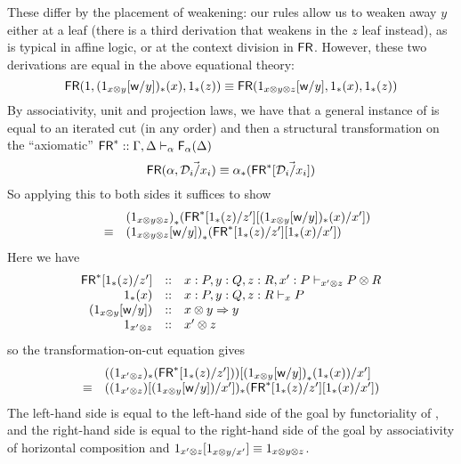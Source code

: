 These differ by the placement of weakening: our rules allow us to weaken
away $y$ either at a leaf (there is a third derivation that weakens in
the $z$ leaf instead), as is typical in affine logic, or at the context
division in $\mathsf{FR}$.  However, these two derivations are equal in the
above equational theory:
\[
\mathsf{FR}(1,(1_{x \otimes y}[\mathsf{w}/y])_*(x),1_*(z))
\equiv
\mathsf{FR}(1_{x \otimes y \otimes z}[\mathsf{w}/y],1_*(x),1_*(z))
\]
By associativity, unit and projection laws, we have that a general
instance of \FR\/ is equal to an iterated cut (in any order) and then a
structural transformation on the ``axiomatic'' $\mathsf{FR}^* ::
\Gamma,\Delta \vdash_{\alpha} \mathsf{F}_{\alpha}(\Delta)$
\[
\mathsf{FR}(\alpha,\vec{\mathcal{D}_i/x_i}) \equiv \alpha_*(\mathsf{FR}^*[\vec{\mathcal{D}_i/x_i}])
\]
So applying this to both sides it suffices to show
\[
\begin{array}{rcl}
& &  {(1_{x \otimes y \otimes z})}_*(\mathsf{FR}^*[1_*(z)/z'][(1_{x \otimes y}[\mathsf{w}/y])_*(x)/x'])\\
& \equiv & {(1_{x \otimes y \otimes z}[\mathsf{w}/y])}_*(\mathsf{FR}^*[1_*(z)/z'][1_*(x)/x']) 
\end{array}
\]
Here we have
\[
\begin{array}{rcl}
\mathsf{FR}^*[1_*(z)/z'] & :: & x:P,y:Q,z:R,x':P \vdash_{x' \otimes z} P \otimes R\\
1_*(x) & :: & x:P,y:Q,z:R \vdash_{x} P\\
{(1_{x \otimes y}[\mathsf{w}/y])} & :: & x \otimes y \Rightarrow y\\
1_{x'\otimes z} & :: & x' \otimes z
\end{array}
\]
so the transformation-on-cut equation gives
\[
\begin{array}{rl}
     & (({1_{x'\otimes z}})_*(\mathsf{FR}^*[1_*(z)/z']))[{(1_{x \otimes y}[\mathsf{w}/y])}_*(1_*(x))/x']\\
 \equiv &  (({1_{x'\otimes z}})[(1_{x \otimes y}[\mathsf{w}/y])/x'])  _*(\mathsf{FR}^*[1_*(z)/z'][1_*(x)/x'])
\end{array}
\]
The left-hand side is equal to the left-hand side of the goal by
functoriality of \Trd{-}{-}, and the right-hand side is equal to the
right-hand side of the goal by associativity of horizontal composition
and $1_{x' \otimes z}[1_{x \otimes y/x'}] \equiv 1_{x \otimes y \otimes
  z}$.  

